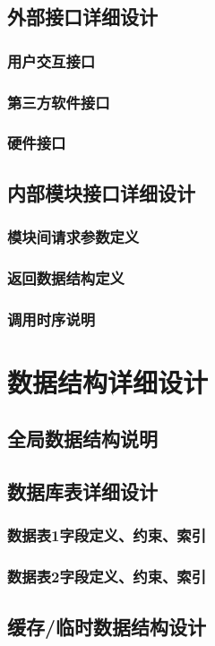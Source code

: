 \documentclass{../template/softeng}
\begin{document}
\subsection{外部接口详细设计}
\subsubsection{用户交互接口}
\subsubsection{第三方软件接口}
\subsubsection{硬件接口}

\subsection{内部模块接口详细设计}
\subsubsection{模块间请求参数定义}
\subsubsection{返回数据结构定义}
\subsubsection{调用时序说明}

\section{数据结构详细设计}
\subsection{全局数据结构说明}
\subsection{数据库表详细设计}
\subsubsection{数据表1字段定义、约束、索引}
\subsubsection{数据表2字段定义、约束、索引}
\subsection{缓存/临时数据结构设计}
\end{document}
